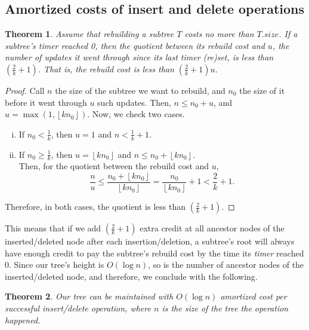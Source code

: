\documentclass{article}
\newtheorem{theorem}{Theorem}
\begin{document}
\subsection{Amortized costs of insert and delete operations}
\begin{theorem}
\label{thm:constUpper}
Assume that rebuilding a subtree $T$ costs no more than $T.size$. If a subtree's timer reached 0, then the quotient between its rebuild cost and $u$, the number of updates it went through since its last timer (re)set, is less than $\left(\frac{2}{k}+1\right)$. That is, the rebuild cost is less than $\left(\frac{2}{k}+1\right)u$.
\end{theorem}
\begin{proof}
Call $n$ the size of the subtree we want to rebuild, and $n_0$ the size of it before it went through $u$ such updates. Then, $n \leq n_0+u$, and $u = \max\left(1, \left\lfloor kn_0 \right\rfloor \right)$. Now, we check two cases.
\begin{enumerate}[(i)]
    \item If $n_0<\frac{1}{k}$, then $u=1$ and $n < \frac{1}{k}+1$.
    \item If $n_0\geq\frac{1}{k}$, then $u=\left\lfloor kn_0 \right\rfloor$ and $n\leq n_0+\left\lfloor kn_0 \right\rfloor$.\\
    Then, for the quotient between the rebuild cost and $u$,
    \begin{equation*}
        \frac{n}{u} \leq \frac{n_0+\left\lfloor kn_0 \right\rfloor}{\left\lfloor kn_0 \right\rfloor} =\frac{n_0}{\left\lfloor kn_0 \right\rfloor}+1 < \frac{2}{k}+1.
    \end{equation*}
\end{enumerate}
Therefore, in both cases, the quotient is less than $\left(\frac{2}{k}+1\right)$.
\end{proof}

This means that if we add $\left(\frac{2}{k}+1\right)$ extra credit at all ancestor nodes of the inserted/deleted node after each insertion/deletion, a subtree's root will always have enough credit to pay the subtree's rebuild cost by the time its \emph{timer} reached 0. Since our tree's height is $O(\log n)$, so is the number of ancestor nodes of the inserted/deleted node, and therefore, we conclude with the following.
\begin{theorem}
Our tree can be maintained with $O(\log n)$ amortized cost per successful insert/delete operation, where $n$ is the size of the tree the operation happened.
\end{theorem}
\end{document}
